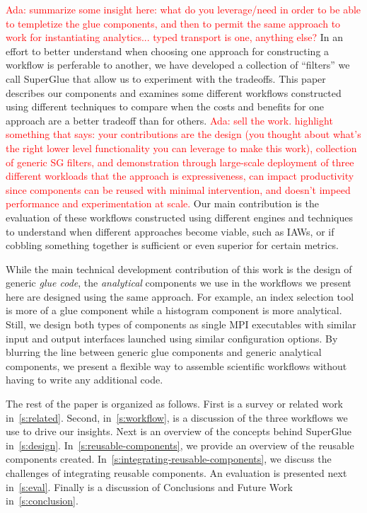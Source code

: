 \documentclass[conference]{IEEEtran}
\newcommand{\ada}[1]{\textcolor{red}{Ada: #1}}
\begin{document}
\ada{summarize some insight here: what do you leverage/need in order
  to be able to templetize the glue components, and then to permit the
same approach to work for instantiating analytics... typed transport
is one, anything else?}
In an effort to better understand when choosing one approach for constructing a
workflow is perferable to another, we have developed a collection of ``filters''
we call SuperGlue that allow us to experiment with the tradeoffs. This paper
describes our components and examines some different workflows constructed using
different techniques to compare when the costs and benefits for one approach are
a better tradeoff than for others. 
\ada{sell the work. highlight something that says: your contributions are the design (you thought
  about what's the right lower level functionality you can leverage to
  make this work), collection of generic SG filters, and demonstration
through large-scale deployment of three different workloads that the
approach is 
expressiveness, can impact productivity since components can be reused
with minimal intervention, and doesn't impeed performance and
experimentation at scale. }
Our main contribution is the evaluation of
these workflows constructed using different engines and techniques to understand
when different approaches become viable, such as IAWs, or if cobbling something
together is sufficient or even superior for certain metrics.

While the main technical development contribution of this work is the design of
generic {\em glue code}, the {\em analytical} components we use in the
workflows we present here are designed using the same approach. For example, an
index selection tool is more of a glue component while a histogram component is
more analytical.  Still, we design both types of components as single MPI
executables with similar input and output interfaces launched using similar
configuration options.  By blurring the line between generic glue components
and generic analytical components, we present a flexible way to assemble
scientific workflows without having to write any additional code. 
\fi

The rest of the paper is organized as follows. First is a survey or related
work in~\autoref{s:related}. Second, in~\autoref{s:workflow}, is a
discussion of the three workflows we use to drive our insights. Next is an
overview of the concepts behind SuperGlue in~\autoref{s:design}.
In~\autoref{s:reusable-components}, we provide an overview of the reusable
components created. In~\autoref{s:integrating-reusable-components}, we
discuss the challenges of integrating reusable components.  An evaluation is
presented next in~\autoref{s:eval}. Finally is a discussion of Conclusions
and Future Work in~\autoref{s:conclusion}.
\end{document}
